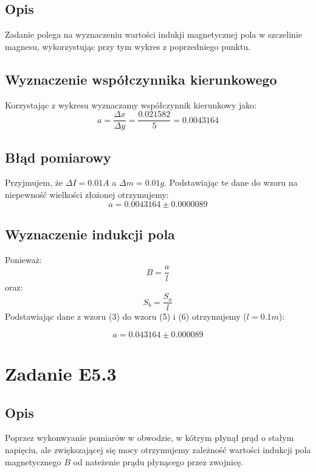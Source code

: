 \documentclass{article} %
\begin{document}
\subsection{Opis}

Zadanie polega na wyznaczeniu wartości indukji magnetycznej pola w szczelinie magnesu, wykorzystując przy tym wykres z poprzedniego punktu.

\subsection{Wyznaczenie współczynnika kierunkowego}

Korzystając z wykresu wyznaczamy współczynnik kierunkowy jako:
{\large
\begin{equation}
    a= \frac{\Delta x}{\Delta y} = \frac{0.021582}{5} = 0.0043164
\end{equation}
}
\subsection{Błąd pomiarowy}
Przyjmujem, że $\Delta I = 0.01A$ a $\Delta m = 0.01g$. Podstawiając te dane do wzoru na niepewność wielkości złożonej otrzymujemy:
{\large
\begin{equation}
    a = 0.0043164\pm 0.0000089
\end{equation}
}
\subsection{Wyznaczenie indukcji pola}
Ponieważ:
{\large
\begin{equation}
    B = \frac{a}{l}
\end{equation}
}
oraz:
{\large
\begin{equation}
    S_b = \frac{S_a}{l}
\end{equation}
}
Podstawiając dane z wzoru (3) do wzoru (5) i (6) otrzymujemy ($l = 0.1m$):

{\large
\begin{equation}
    a = 0.043164\pm0.000089
\end{equation}
}
\section{Zadanie E5.3}

\subsection{Opis}

Poprzez wykonwyanie pomiarów w obwodzie, w kótrym płynął prąd o stałym napięciu, ale zwiększającej się mocy otrzymujemy zależność wartości indukcji pola magnetycznego $B$ od nateżenie prądu płynącego przez zwojnicę.
\end{document}
